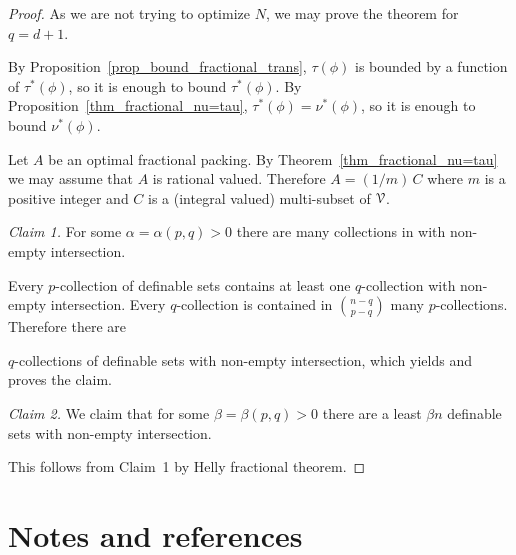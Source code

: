 \documentclass[sputnik.tex]{subfiles}
\begin{document}
\begin{proof}
As we are not trying to optimize $N$, we may prove the theorem for $q=d+1$.

By Proposition~\ref{prop_bound_fractional_trans}, $\tau(\phi)$ is bounded by a function of $\tau^*(\phi)$, so it is enough to bound $\tau^*(\phi)$. By Proposition~\ref{thm_fractional_nu=tau},  $\tau^*(\phi)=\nu^*(\phi)$, so it is enough to bound $\nu^*(\phi)$.

Let $A$ be an optimal fractional packing. By Theorem~\ref{thm_fractional_nu=tau} we may assume that $A$ is rational valued. Therefore $A=(1/m)\,C$ where $m$ is a positive integer and $C$ is a (integral valued) multi-subset of $\EuScript V$.

\smallskip
\textit{Claim 1.}
For some $\alpha=\alpha(p,q)>0$ there are  many collections in  with non-empty intersection.

Every $p$-collection of definable sets contains at least one $q$-collection with non-empty intersection.
Every $q$-collection is contained in ${n-q\choose p-q}$ many $p$-collections.
Therefore there are


$q$-collections of definable sets with non-empty intersection, which yields  and proves the claim.

\smallskip
\textit{Claim 2.}
We claim that for some $\beta=\beta(p,q)>0$ there are a least $\beta n$ definable sets with non-empty intersection.

This follows from Claim~1 by Helly fractional theorem.


\end{proof}

\section{Notes and references}

\begin{biblist}[]\normalsize
{}


\bib{M2004}{article}{
   author={Matou\v sek, Ji\v r\'\i },
   title={Bounded VC-dimension implies a fractional Helly theorem},
   journal={Discrete Comput. Geom.},
   volume={31},
   date={2004},
   number={2},
   pages={251--255},
   }
   
   
\end{biblist}
\end{document}
